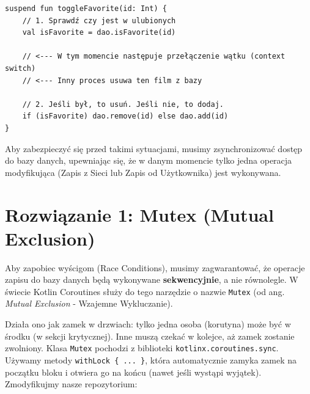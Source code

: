 \begin{verbatim}
suspend fun toggleFavorite(id: Int) {
    // 1. Sprawdź czy jest w ulubionych
    val isFavorite = dao.isFavorite(id) 
    
    // <--- W tym momencie następuje przełączenie wątku (context switch)
    // <--- Inny proces usuwa ten film z bazy
    
    // 2. Jeśli był, to usuń. Jeśli nie, to dodaj.
    if (isFavorite) dao.remove(id) else dao.add(id)
}
\end{verbatim}

Aby zabezpieczyć się przed takimi sytuacjami, musimy zsynchronizować dostęp do bazy danych, upewniając się, że w danym momencie tylko jedna operacja modyfikująca (Zapis z Sieci lub Zapis od Użytkownika) jest wykonywana.

\section{Rozwiązanie 1: Mutex (Mutual Exclusion)}

Aby zapobiec wyścigom (Race Conditions), musimy zagwarantować, że operacje zapisu do bazy danych będą wykonywane \textbf{sekwencyjnie}, a nie równolegle. W świecie Kotlin Coroutines służy do tego narzędzie o nazwie \texttt{Mutex} (od ang. \textit{Mutual Exclusion} - Wzajemne Wykluczanie).

Działa ono jak zamek w drzwiach: tylko jedna osoba (korutyna) może być w środku (w sekcji krytycznej). Inne muszą czekać w kolejce, aż zamek zostanie zwolniony. Klasa \texttt{Mutex} pochodzi z biblioteki \texttt{kotlinx.coroutines.sync}. Używamy metody \texttt{withLock \{ ... \}}, która automatycznie zamyka zamek na początku bloku i otwiera go na końcu (nawet jeśli wystąpi wyjątek). Zmodyfikujmy nasze repozytorium:

